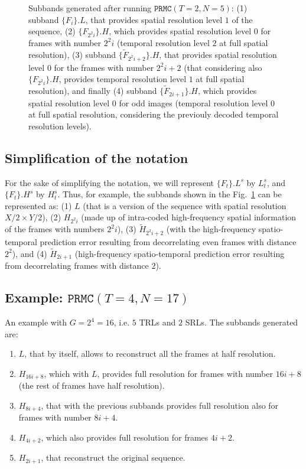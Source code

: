 \begin{figure}
  \centering
  \caption{Subbands generated after running $\mathtt{PRMC}(T=2, N=5)$:
    (1) subband $\{F_i\}.L$, that provides spatial resolution level
    $1$ of the sequence, (2) $\{F_{2^2i}\}.H$, which provides spatial
    resolution level $0$ for frames with number $2^2i$ (temporal
    resolution level $2$ at full spatial resolution), (3) subband
    $\{{\tilde F}_{2^2i+2}\}.H$, that provides spatial resolution
    level $0$ for the frames with number $2^2i+2$ (that considering
    also $\{F_{2^2i}\}.H$, provides temporal resolution level $1$ at
    full spatial resolution), and finally (4) subband $\{{\tilde
      F}_{2i+1}\}.H$, which provides spatial resolution level $0$ for
    odd images (temporal resolution level $0$ at full spatial
    resolution, considering the previouly decoded temporal resolution
    levels).}
  \label{fig:1xPRMC2}
\end{figure}


\subsection{Simplification of the notation}

For the sake of simplifying the notation, we will represent
$\{F_t\}.L^s$ by $L_t^s$, and $\{F_t\}.H^s$ by $H_t^s$. Thus, for
example, the subbands shown in the Fig.~\ref{fig:1xPRMC2} can be
represented as: (1) $L$ (that is a version of the sequence with
spatial resolution $X/2\times Y/2$), (2) $H_{2^2i}$ (made up of
intra-coded high-frequency spatial information of the frames with
numbers $2^2i$), (3) $\tilde{H}_{2^2i+2}$ (with the high-frequency
spatio-temporal prediction error resulting from decorrelating even
frames with distance $2^2$), and (4) $\tilde{H}_{2i+1}$
(high-frequency spatio-temporal prediction error resulting from
decorrelating frames with distance $2$).


\subsection{Example: $\mathtt{PRMC}(T=4, N=17)$}

An example with $G=2^4=16$, i.e. $5$ TRLs and $2$ SRLs. The subbands
generated are:
\begin{enumerate}
\item $L$, that by itself, allows to reconstruct all the frames at
  half resolution.
\item $H_{16i+8}$, which with $L$, provides full resolution for frames
  with number $16i+8$ (the rest of frames have half resolution).
\item $H_{8i+4}$, that with the previous subbands provides full
  resolution also for frames with number $8i+4$.
\item $H_{4i+2}$, which also provides full resolution for frames $4i+2$.
\item $H_{2i+1}$, that reconstruct the original sequence.
\end{enumerate}

